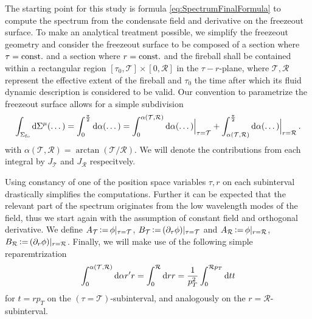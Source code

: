 The starting point for this study is formula \eqref{eq:SpectrumFinalFormula} to compute the spectrum from the condensate field and derivative on the freezeout surface. To make an analytical treatment possible, we simplify the freezeout geometry and consider the freezeout surface to be composed of a section where $\tau={\text{const.}}$ and a section where $r={\text{const.}}$ and the fireball shall be contained within a rectangular region ${[\tau_0,\mathcal{T}]\times[0,\mathcal{R}]}$ in the ${\tau-r}$-plane, where ${\mathcal{T},\mathcal{R}}$ represent the effective extent of the fireball and $\tau_0$ the time after which its fluid dynamic description is considered to be valid. Our convention to parametrize the freezeout surface allows for a simple subdivision
\begin{equation}
    \int_{\Sigma_{\text{fo}}}\text{d}\Sigma^\mu(\dots)=\int_0^{\frac{\pi}{2}}\text{d}\alpha(\dots)=\int_0^{\alpha(\mathcal{T},\mathcal{R})}\text{d}\alpha(\dots)\Big\vert_{\tau=\mathcal{T}}+\int_{\alpha(\mathcal{T},\mathcal{R})}^{\frac{\pi}{2}}\text{d}\alpha(\dots)\Big\vert_{r=\mathcal{R}}\,.
\end{equation}
with ${\alpha(\mathcal{T},\mathcal{R})=\arctan(\mathcal{T}/\mathcal{R})}$. We will denote the contributions from each integral by $J_{\mathcal{T}}$ and ${J_{\mathcal{R}}}$ respecitvely.

Using constancy of one of the position space variables ${\tau,r}$ on each subinterval drastically simplifies the computations. Further it can be expected that the relevant part of the spectrum originates from the low wavelength modes of the field, thus we start again with the assumption of constant field and orthogonal derivative. We define ${A_\mathcal{T}{\,\vcentcolon=\,}\phi\vert_{\tau=\mathcal{T}}}$, ${B_\mathcal{T}{\,\vcentcolon=\,}(\partial_\tau\phi)\vert_{\tau=\mathcal{T}}}$ and ${A_\mathcal{R}{\,\vcentcolon=\,}\phi\vert_{r=\mathcal{R}}}$, ${B_\mathcal{R}{\,\vcentcolon=\,}(\partial_r\phi)\vert_{r=\mathcal{R}}}$. Finally, we will make use of the following simple reparemtrization
\begin{equation}
    \int_0^{\alpha(\mathcal{T},\mathcal{R})}\text{d}\alpha r^\prime r=\int_0^\mathcal{R}\text{d} rr=\frac{1}{p_T^2}\int_0^{\mathcal{R}p_T}\text{d} tt
\end{equation}
for ${t=rp_T}$ on the $(\tau=\mathcal{T})$-subinterval, and analogously on the $r=\mathcal{R}$-subinterval.

